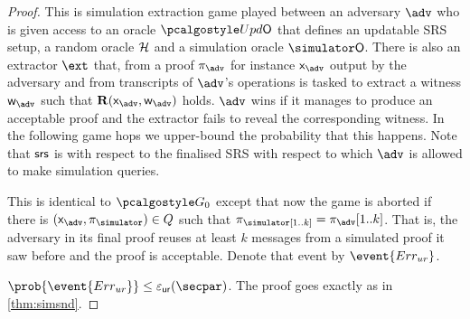 \begin{proof}		

   This is simulation extraction game played between an adversary
  $\advse$ who is given access to an oracle $\initU$ that defines an updatable SRS setup, a random oracle $\mathcal{H}$ and a simulation oracle
  $\simO$. There is also an extractor $\ext$ that, from a proof
  $\zkproof_{\advse}$ for instance $\inp_{\advse}$ output by the adversary and from
   transcripts of $\advse$'s operations is tasked to extract a witness
  $\wit_{\advse}$ such that $\REL(\inp_{\advse}, \wit_{\advse})$ holds. $\advse$ wins
  if it manages to produce an acceptable proof and the extractor fails to reveal
  the corresponding witness. In the following game hops we upper-bound the
  probability that this happens. Note that $\mathsf{srs}$ is with respect to the finalised SRS with respect to which $\adv$ is allowed to make simulation queries.

   This is identical to $\game{0}$ except that now the game is aborted
  if there is $(\inp_\advse, \zkproof_{\simulator}) \in Q$ such that $\zkproof_\simulator[1..k] = \zkproof_{\advse}[1..k]$. That is, the adversary in its final proof
  reuses at least $k$ messages from a simulated proof it saw before and the proof is acceptable.
  Denote that event by $\event{\errur}$.

   $\prob{\event{\errur}} \leq \epsur(\secpar)$. The
  proof goes exactly as in \cref{thm:simsnd}.

\end{proof}
